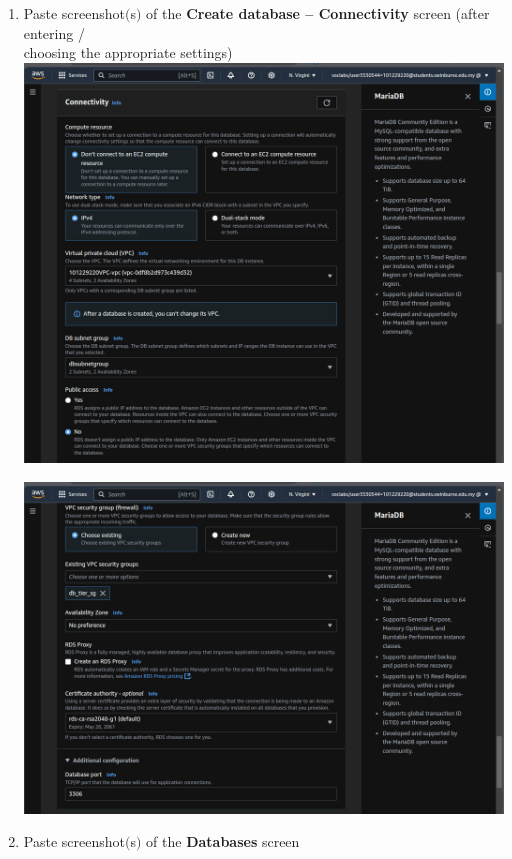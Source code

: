 \documentclass[11pt]{article}
\begin{document}
\begin{enumerate}[resume]
    
    \item Paste screenshot$($s$)$ of the \textbf{Create database – Connectivity} screen (after entering / \\choosing the appropriate settings) \\

    {\centering
    \includegraphics[width=5.8in]{pics/30a.png}
    }

    {\centering
    \includegraphics[width=5.8in]{pics/30b.png}
    }



    \item Paste screenshot$($s$)$ of the \textbf{Databases} screen \\
    \vspace{0.01mm}


\end{enumerate}
\end{document}

